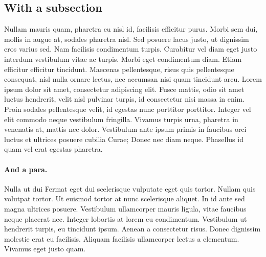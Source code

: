\subsection{With a subsection}
Nullam mauris quam, pharetra eu nisl id, facilisis efficitur
purus. Morbi sem dui, mollis in augue at, sodales pharetra nisl. Sed
posuere lacus justo, ut dignissim eros varius sed. Nam facilisis
condimentum turpis. Curabitur vel diam eget justo interdum vestibulum
vitae ac turpis. Morbi eget condimentum diam. Etiam efficitur
efficitur tincidunt. Maecenas pellentesque, risus quis pellentesque
consequat, nisl nulla ornare lectus, nec accumsan nisi quam tincidunt
arcu. Lorem ipsum dolor sit amet, consectetur adipiscing elit. Fusce
mattis, odio sit amet luctus hendrerit, velit nisl pulvinar turpis, id
consectetur nisi massa in enim. Proin sodales pellentesque velit, id
egestas nunc porttitor porttitor. Integer vel elit commodo neque
vestibulum fringilla. Vivamus turpis urna, pharetra in venenatis at,
mattis nec dolor. Vestibulum ante ipsum primis in faucibus orci luctus
et ultrices posuere cubilia Curae; Donec nec diam neque. Phasellus id
quam vel erat egestas pharetra.

\paragraph{And a para.} Nulla ut dui Fermat eget dui scelerisque vulputate eget quis tortor. Nullam
quis volutpat tortor. Ut euismod tortor at nunc scelerisque
aliquet. In id ante sed magna ultrices posuere. Vestibulum ullamcorper
mauris ligula, vitae faucibus neque placerat nec. Integer lobortis at
lorem eu condimentum. Vestibulum ut hendrerit turpis, eu tincidunt
ipsum. Aenean a consectetur risus. Donec dignissim molestie erat eu
facilisis. Aliquam facilisis ullamcorper lectus a elementum. Vivamus
eget justo quam.
